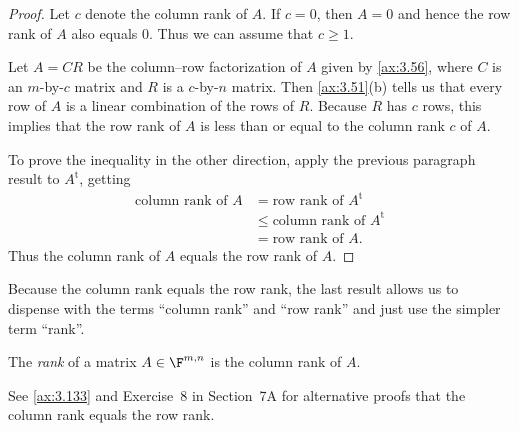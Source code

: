 \begin{proof}
Let $c$ denote the column rank of $A$. If $c=0$, then $A=0$ and hence the row
rank of $A$ also equals $0$. Thus we can assume that $c\ge1$.

Let $A=CR$ be the column--row factorization of $A$ given by \ref{ax:3.56},
where $C$ is an $m$-by-$c$ matrix and $R$ is a $c$-by-$n$ matrix. Then
\ref{ax:3.51}(b) tells us that every row of $A$ is a linear combination of the
rows of $R$. Because $R$ has $c$ rows, this implies that the row rank of $A$ is
less than or equal to the column rank $c$ of $A$.

To prove the inequality in the other direction, apply the previous paragraph
result to $A^{\mathrm{t}}$, getting
\begin{align*}
\text{column rank of } A &= \text{row rank of } A^{\mathrm{t}}\\
  &\le \text{column rank of } A^{\mathrm{t}}\\
  &= \text{row rank of } A.
\end{align*}
Thus the column rank of $A$ equals the row rank of $A$.
\end{proof}

Because the column rank equals the row rank, the last result allows us to
dispense with the terms ``column rank'' and ``row rank'' and just use the
simpler term ``rank''.

\begin{definition}[Rank]\label{ax:3.58}
The \emph{rank} of a matrix $A\in\F^{m,n}$ is the column rank of $A$.
\end{definition}

See \ref{ax:3.133} and Exercise~8 in Section~7A for alternative proofs that the
column rank equals the row rank.

